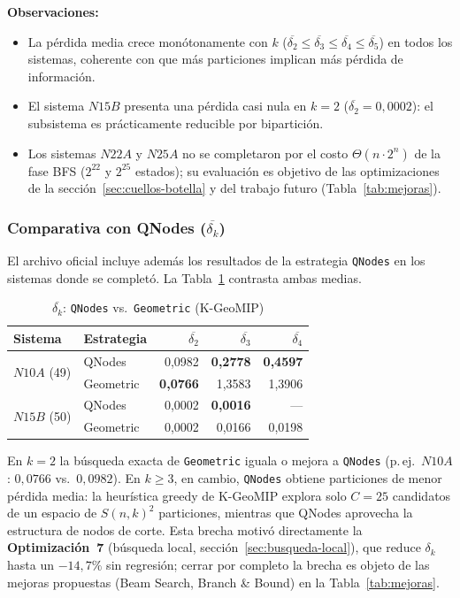 \documentclass[12pt,letterpaper]{article}
\theoremstyle{definition}
\theoremstyle{remark}
\newcommand{\BigTheta}[1]{\Theta(#1)}
\begin{document}
\noindent\textbf{Observaciones:}
\begin{itemize}
  \item La pérdida media crece monótonamente con $k$
    ($\overline{\delta_2} \leq \overline{\delta_3} \leq \overline{\delta_4} \leq \overline{\delta_5}$)
    en todos los sistemas, coherente con que más particiones implican más pérdida de información.
  \item El sistema $N15B$ presenta una pérdida casi nula en $k=2$
    ($\overline{\delta_2} = 0{,}0002$): el subsistema es prácticamente reducible por bipartición.
  \item Los sistemas $N22A$ y $N25A$ no se completaron por el costo $\BigTheta{n \cdot 2^n}$ de la
    fase BFS ($2^{22}$ y $2^{25}$ estados); su evaluación es objetivo de las optimizaciones de la
    sección~\ref{sec:cuellos-botella} y del trabajo futuro (Tabla~\ref{tab:mejoras}).
\end{itemize}

\subsubsection*{Comparativa con QNodes ($\overline{\delta_k}$)}

El archivo oficial incluye además los resultados de la estrategia \texttt{QNodes} en los
sistemas donde se completó. La Tabla~\ref{tab:calidad-qnodes} contrasta ambas medias.

\begin{table}[ht]
\centering
\caption{$\overline{\delta_k}$: \texttt{QNodes} vs.\ \texttt{Geometric} (K-GeoMIP)}
\label{tab:calidad-qnodes}
\begin{tabular}{@{}l l r r r@{}}
\toprule
\textbf{Sistema} & \textbf{Estrategia} & $\overline{\delta_2}$ & $\overline{\delta_3}$ & $\overline{\delta_4}$ \\
\midrule
\multirow{2}{*}{$N10A$ (49)} & QNodes    & 0{,}0982 & \textbf{0{,}2778} & \textbf{0{,}4597} \\
                             & Geometric & \textbf{0{,}0766} & 1{,}3583 & 1{,}3906 \\
\midrule
\multirow{2}{*}{$N15B$ (50)} & QNodes    & 0{,}0002 & \textbf{0{,}0016} & --- \\
                             & Geometric & 0{,}0002 & 0{,}0166 & 0{,}0198 \\
\bottomrule
\end{tabular}
\end{table}

\noindent En $k=2$ la búsqueda exacta de \texttt{Geometric} iguala o mejora a \texttt{QNodes}
(p.\,ej.\ $N10A$: $0{,}0766$ vs.\ $0{,}0982$). En $k \geq 3$, en cambio, \texttt{QNodes} obtiene
particiones de menor pérdida media: la heurística greedy de K-GeoMIP explora solo $C=25$
candidatos de un espacio de $S(n,k)^2$ particiones, mientras que QNodes aprovecha la estructura
de nodos de corte. Esta brecha motivó directamente la \textbf{Optimización~7} (búsqueda local,
sección~\ref{sec:busqueda-local}), que reduce $\delta_k$ hasta un $-14{,}7\%$ sin regresión;
cerrar por completo la brecha es objeto de las mejoras propuestas (Beam Search, Branch \& Bound)
en la Tabla~\ref{tab:mejoras}.
\end{document}
